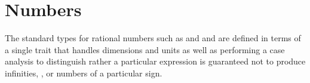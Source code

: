 %
%
%
%

\chapter{Numbers}


The standard types for rational numbers such as  and 
and  are defined in terms of a single trait 
that handles dimensions and units as well as performing a case analysis to distinguish
rather a particular expression is guaranteed not to produce infinities, ,
or numbers of a particular sign.

